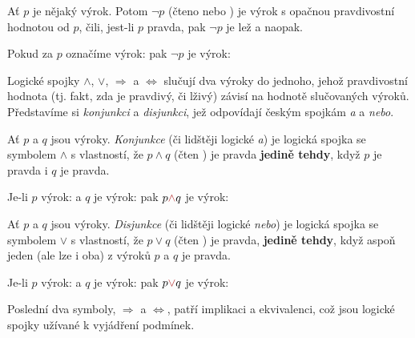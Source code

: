 \begin{definition}[Negace]
  \label{def:negace}
  Ať $p$ je nějaký výrok. Potom $\neg p$ (čteno  nebo ) je výrok s opačnou pravdivostní hodnotou od $p$, čili, jest-li $p$
  pravda, pak $\neg p$ je lež a naopak.
\end{definition}

\begin{example}
  \label{exam:negace}
  Pokud za $p$ označíme výrok:  pak $\neg p$ je výrok:
\end{example}

Logické spojky $ \wedge $, $ \vee $, $ \Rightarrow $ a $ \Leftrightarrow $
slučují dva výroky do jednoho, jehož pravdivostní hodnota (tj. fakt, zda je
pravdivý, či lživý) závisí na hodnotě slučovaných výroků. Představíme si
\emph{konjunkci} a \emph{disjunkci}, jež odpovídají českým spojkám \emph{a} a
\emph{nebo}.

\begin{definition}[Konjunkce]
  \label{def:konjunkce}
  Ať $p$ a $q$ jsou výroky. \emph{Konjunkce} (či lidštěji logické \emph{a}) je
  logická spojka se symbolem $ \wedge $ s vlastností, že $p \wedge q$ (čten
  ) je pravda \textbf{jedině tehdy}, když $p$ je pravda i $q$ je
  pravda.
\end{definition}

\begin{example}
  \label{exam:konjunkce}
  Je-li $p$ výrok:  a $q$ je výrok:  pak $p
  \clr{ \wedge } q$ je výrok: 
\end{example}

\begin{definition}[Disjunkce]
  \label{def:disjunkce}
  Ať $p$ a $q$ jsou výroky. \emph{Disjunkce} (či lidštěji logické \emph{nebo})
  je logická spojka se symbolem $\vee$ s vlastností, že $p \vee q$ (čten
  ) je pravda, \textbf{jedině tehdy}, když aspoň jeden (ale lze
  i oba) z výroků $p$ a $q$ je pravda.
\end{definition}

\begin{example}
  \label{exam:disjunkce}
  Je-li $p$ výrok:  a $q$ je výrok: 
  pak $p \clr{ \vee } q$ je výrok: 
\end{example}

Poslední dva symboly, $ \Rightarrow $ a $ \Leftrightarrow $, patří implikaci a
ekvivalenci, což jsou logické spojky užívané k vyjádření podmínek.

